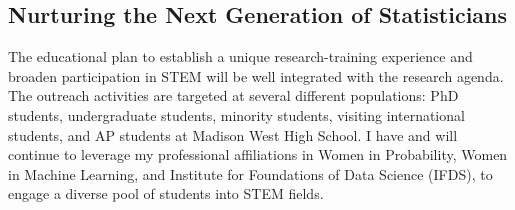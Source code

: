 \documentclass[11pt]{article}
\theoremstyle{exampstyle}
\theoremstyle{definition}
\begin{document}
\vspace{-.3cm}
\subsection{Nurturing the Next Generation of Statisticians}
\vspace{-.3cm}
The educational plan to establish a unique research-training experience and broaden participation in STEM will be well integrated with the research agenda. The outreach activities are targeted at several different populations: PhD students, undergraduate students, minority students, visiting international students, and AP students at Madison West High School. I have and will continue to leverage my professional affiliations in Women in Probability, Women in Machine Learning, and Institute for Foundations of Data Science (IFDS), to engage a diverse pool of students into STEM fields. 
\end{document}
